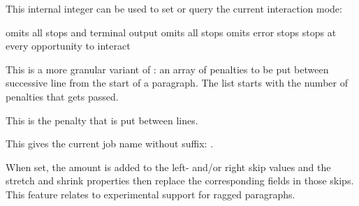 \stopnewprimitive

\startoldprimitive[title={\prm {interactionmode}}]

This internal integer can be used to set or query the current interaction mode:

\starttabulate[||||]
\NC \type {\batchmode    } \NC \the\batchmodecode     \NC omits all stops and terminal output \NC \NR
\NC \type {\nonstopmode  } \NC \the\nonstopmodecode   \NC omits all stops \NC \NR
\NC \type {\scrollmode   } \NC \the\scrollmodecode    \NC omits error stops \NC \NR
\NC \type {\errorstopmode} \NC \the\errorstopmodecode \NC stops at every opportunity to interact \NC \NR
\stoptabulate

%

\stopoldprimitive

\startoldprimitive[title={\prm {interlinepenalties}}]

This is a more granular variant of : an array of penalties
to be put between successive line from the start of a paragraph. The list starts
with the number of penalties that gets passed.

\stopoldprimitive

\startoldprimitive[title={\prm {interlinepenalty}}]

This is the penalty that is put between lines.

\stopoldprimitive

\startoldprimitive[title={\prm {jobname}}]

This gives the current job name without suffix: {\tttf \jobname}.

\stopoldprimitive

\startnewprimitive[title={\prm {justificationskip}}]

When set, the amount is added to the left- and/or right skip values and the
stretch and shrink properties then replace the corresponding fields in those
skips. This feature relates to experimental support for ragged paragraphs.

